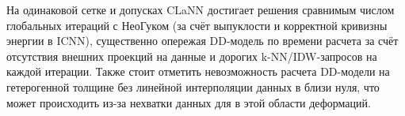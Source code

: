   На одинаковой сетке и допусках CLaNN достигает решения сравнимым числом глобальных итераций с Нео\textendash Гуком
  (за счёт выпуклости и корректной кривизны энергии в ICNN), существенно опережая DD-модель по времени расчета
  за счёт отсутствия внешних проекций на данные и дорогих k-NN/IDW-запросов на каждой итерации.
  Также стоит отметить невозможность расчета DD-модели на гетерогенной толщине без линейной интерполяции данных в близи нуля, 
  что может происходить из-за нехватки данных для в этой области деформаций.


